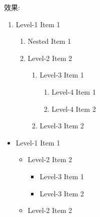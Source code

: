 \begin{itemize}
{  效果:
  \begin{enumerate}
    \item
    {
    Level-1 Item 1
    \begin{enumerate}
    \item Nested Item 1

    \item
    {
      Level-2 Item 2

      \begin{enumerate}
      \item
      {
        Level-3 Item 1

        \begin{enumerate}
        \item Level-4 Item 1
        \item Level-4 Item 2
        \end{enumerate}
      }

      \item Level-3 Item 2
      \end{enumerate}
    }
    \end{enumerate}
    }
  \end{enumerate}

  \begin{itemize}
    \item
    {
    Level-1 Item 1

    \begin{itemize}
    \item
    {
      Level-2 Item 2

      \begin{itemize}
      \item Level-3 Item 1
      \item Level-3 Item 2
      \end{itemize}
    }

    \item Level-2 Item 2
    \end{itemize}
    }
  \end{itemize}

  } %
\end{itemize}
